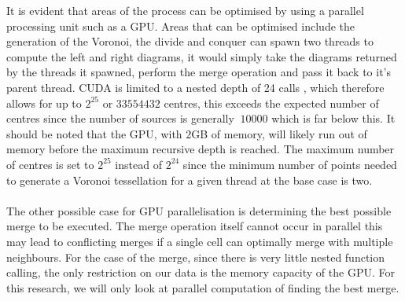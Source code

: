 It is evident that areas of the process can be optimised by using a parallel processing unit such as a GPU. Areas that can be optimised include the generation of the Voronoi, the divide and conquer can spawn two threads to compute the left and right diagrams, it would simply take the diagrams returned by the threads it spawned, perform the merge operation and pass it back to it's parent thread. CUDA is limited to a nested depth of 24 calls \citep{CUDA}, which therefore allows for up to $2^{25}$ or $33554432$ centres, this exceeds the expected number of centres since the number of sources is generally $~10000$ which is far below this. It should be noted that the GPU, with $2$GB of memory, will likely run out of memory before the maximum recursive depth is reached. The maximum number of centres is set to $2^{25}$ instead of $2^{24}$ since the minimum number of points needed to generate a Voronoi tessellation for a given thread at the base case is two.
\\
\\
The other possible case for GPU parallelisation is determining the best possible merge to be executed. The merge operation itself cannot occur in parallel this may lead to conflicting merges if a single cell can optimally merge with multiple neighbours. For the case of the merge, since there is very little nested function calling, the only restriction on our data is the memory capacity of the GPU. For this research, we will only look at parallel computation of finding the best merge.
